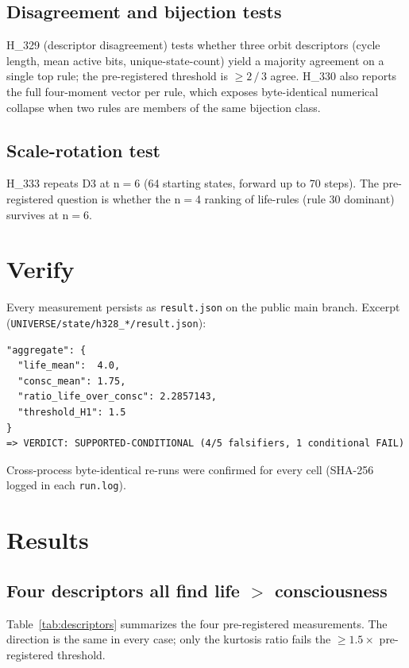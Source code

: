 \documentclass[11pt,a4paper]{article}
\begin{document}
\subsection{Disagreement and bijection tests}
H\_329 (descriptor disagreement) tests whether three orbit
descriptors (cycle length, mean active bits, unique-state-count) yield
a majority agreement on a single top rule; the pre-registered
threshold is $\geq 2\,/\,3$ agree. H\_330 also reports the full
four-moment vector per rule, which exposes byte-identical numerical
collapse when two rules are members of the same bijection class.

\subsection{Scale-rotation test}
H\_333 repeats D3 at n$=$6 (64 starting states, forward up to 70
steps). The pre-registered question is whether the n$=$4 ranking of
life-rules (rule 30 dominant) survives at n$=$6.

\section{Verify}
\label{sec:verify}

Every measurement persists as \texttt{result.json} on the public main
branch. Excerpt (\texttt{UNIVERSE/state/h328\_*/result.json}):

\begin{lstlisting}[basicstyle=\ttfamily\small,frame=single,xleftmargin=0pt]
"aggregate": {
  "life_mean":  4.0,
  "consc_mean": 1.75,
  "ratio_life_over_consc": 2.2857143,
  "threshold_H1": 1.5
}
=> VERDICT: SUPPORTED-CONDITIONAL (4/5 falsifiers, 1 conditional FAIL)
\end{lstlisting}

Cross-process byte-identical re-runs were confirmed for every cell
(SHA-256 logged in each \texttt{run.log}).

\section{Results}
\label{sec:results}

\subsection{Four descriptors all find life $>$ consciousness}
Table~\ref{tab:descriptors} summarizes the four pre-registered
measurements. The direction is the same in every case; only the
kurtosis ratio fails the $\geq 1.5\times$ pre-registered threshold.
\end{document}
